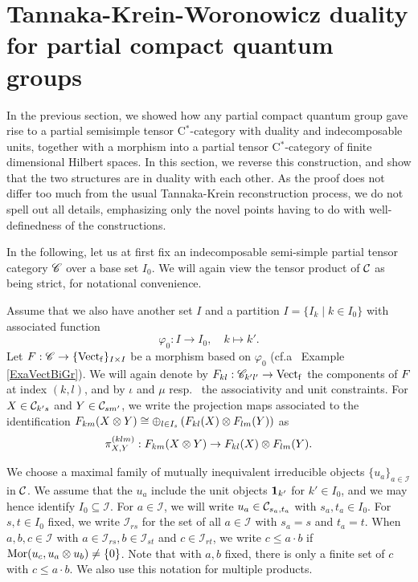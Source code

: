 
\section{Tannaka-Krein-Woronowicz duality for partial compact quantum groups}


In the previous section, we showed how any partial compact quantum group gave rise to a partial semisimple tensor C$^*$-category with duality and indecomposable units, together with a morphism into a partial tensor C$^*$-category of finite dimensional Hilbert spaces. In this section, we reverse this construction, and show that the two structures are in duality with each other. As the proof does not differ too much from the usual Tannaka-Krein reconstruction process, we do not spell out all details, emphasizing only the novel points having to do with well-definedness of the constructions.  %

In the following, let us at first fix an indecomposable semi-simple partial tensor category $\mathscr{C}$ over a base set $I_0$. We will again view the tensor product of $\mathcal{C}$ as being strict, for notational convenience. 

Assume that we also have another set $I$ and a partition $I = \{I_k\mid k\in I_0\}$ with associated function \[\varphi_0:I\rightarrow I_0, \quad k\mapsto k'.\] Let $F: \mathscr{C}\rightarrow \{\mathrm{Vect}_{\operatorname{\mathrm{f}}}\}_{I\times I}$ be a morphism based on $\varphi_0$ (cf.a~ Example \ref{ExaVectBiGr}).  We will again denote by $F_{kl}:\mathscr{C}_{k'l'}\rightarrow \mathrm{Vect}_{\operatorname{\mathrm{f}}}$ the components of $F$ at index $(k,l)$, and by $\iota$ and $\mu$ resp.~ the associativity and unit constraints.  For $X\in \mathcal{C}_{k's}$ and $Y\in \mathcal{C}_{sm'}$, we write the projection maps associated to the identification $F_{km}(X\otimes Y)\cong \oplus_{l\in I_s} \left(F_{kl}(X)\otimes F_{lm}(Y)\right)$ as \[\pi^{(klm)}_{X,Y}:F_{km}(X\otimes Y) \rightarrow F_{kl}(X)\otimes F_{lm}(Y).\]

We choose a maximal family of mutually inequivalent irreducible objects $\{u_a\}_{a\in \mathcal{I}}$ in $\mathcal{C}$. We assume that the $u_a$ include the unit objects $\mathbf{1}_{k'}$ for $k'\in I_0$, and we may hence identify $I_0\subseteq \mathcal{I}$. For $a\in \mathcal{I}$, we will write $u_a \in \mathcal{C}_{s_a,t_a}$ with $s_a,t_a\in I_0$. For $s,t\in I_0$ fixed, we write $\mathcal{I}_{rs}$ for the set of all $a\in \mathcal{I}$ with $s_a=s$ and $t_a=t$. When $a,b,c\in \mathcal{I}$ with $a\in \mathcal{I}_{rs},b\in \mathcal{I}_{st}$ and $c\in \mathcal{I}_{rt}$, we write $c\leq a\cdot b$ if $\mathrm{Mor}(u_c,u_a\otimes u_b)\neq \{0\}$. Note that with $a,b$ fixed, there is only a finite set of $c$ with $c\leq a\cdot b$. We also use this notation for multiple products.

